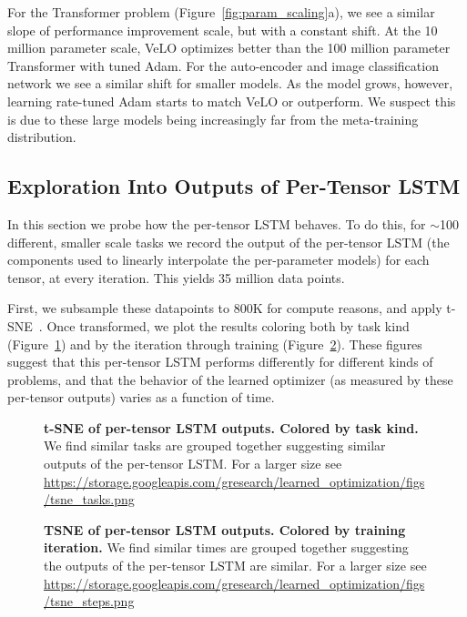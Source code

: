 \documentclass[11pt]{article}
\begin{document}
For the Transformer problem (Figure~\ref{fig:param_scaling}a), we see a similar slope of performance improvement scale, but with a constant shift.
At the 10 million parameter scale, VeLO optimizes better than the 100 million parameter Transformer with tuned Adam.
For the auto-encoder and image classification network we see a similar shift for smaller models.
As the model grows, however, learning rate-tuned Adam starts to match VeLO or outperform.
We suspect this is due to these large models being increasingly far from the meta-training distribution.


\subsection{Exploration Into Outputs of Per-Tensor LSTM}
In this section we probe how the per-tensor LSTM behaves.
To do this, for $\sim$100 different, smaller scale tasks we record the output of the per-tensor LSTM (the components used to linearly interpolate the per-parameter models) for each tensor, at every iteration.
This yields 35 million data points.

First, we subsample these datapoints to 800K for compute reasons, and apply t-SNE~\citep{maaten2008visualizing}. Once transformed, we plot the results coloring both by task kind (Figure~\ref{fig:tsne_task}) and by the iteration through training (Figure~\ref{fig:tsne_step}).
These figures suggest that this per-tensor LSTM performs differently for different kinds of problems, and that the behavior of the learned optimizer (as measured by these per-tensor outputs) varies as a function of time.

\begin{figure}[t!]
    \centering
    \caption{\textbf{t-SNE of per-tensor LSTM outputs. Colored by task kind.} We find similar tasks are grouped together suggesting similar outputs of the per-tensor LSTM. For a larger size see \url{https://storage.googleapis.com/gresearch/learned_optimization/figs/tsne_tasks.png}
    \label{fig:tsne_task}
    }
\end{figure}


\begin{figure}[t!]
    \centering
    \caption{\textbf{TSNE of per-tensor LSTM outputs. Colored by training iteration.} We find similar times are grouped together suggesting the outputs of the per-tensor LSTM are similar. For a larger size see \url{https://storage.googleapis.com/gresearch/learned_optimization/figs/tsne_steps.png}
    \label{fig:tsne_step}
    }
\end{figure}
\end{document}
